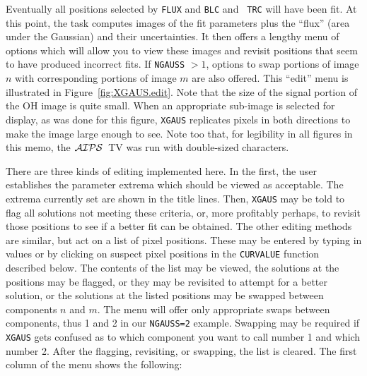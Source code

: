 \documentclass[twoside]{article}
\newcommand{\Hi}[1]{\textcolor{hicol}{#1}}
\newcommand{\AIPS}{{$\cal AIPS\/$}}
\begin{document}
Eventually all positions selected by {\tt FLUX} and {\tt BLC} and {\tt
  TRC} will have been fit.  At this point, the task computes images of
the fit parameters plus the ``flux'' (area under the Gaussian) and
their uncertainties.  It then offers a lengthy menu of options which
will allow you to view these images and revisit positions that seem to
have produced incorrect fits.  If {\tt NGAUSS} $> 1$, options to swap
portions of image $n$ with corresponding portions of image $m$ are
also offered.  This ``edit'' menu is illustrated in
Figure~\ref{fig:XGAUS.edit}.  Note that the size of the \Hi{signal
  portion of the} OH image is quite small.  \Hi{When an appropriate
  sub-image is selected for display, as was done for this figure},
{\tt XGAUS} replicates pixels in both directions to make the image
large enough to see.  Note too that, for legibility in all figures in
this memo, the \AIPS\ TV was run with double-sized characters.

There are three kinds of editing implemented here.  In the first, the
user establishes the parameter extrema which should be viewed as
acceptable.  The extrema currently set are shown in the title lines.
Then, {\tt XGAUS} may be told to flag all solutions not meeting these
criteria, or, more profitably perhaps, to revisit those positions to
see if a better fit can be obtained.  The other editing methods are
similar, but act on a list of pixel positions.  These may be entered
by typing in values or by clicking on suspect pixel positions in the
{\tt CURVALUE} function described below.  The contents of the list may
be viewed, the solutions at the positions may be flagged, or they may
be revisited to attempt for a better solution, or the solutions at the
listed positions may be swapped between components $n$ and $m$.  The
menu will offer only appropriate swaps between components, thus 1 and
2 in our {\tt NGAUSS=2} example.  Swapping may be required if {\tt
  XGAUS} gets confused as to which component you want to call number 1
and which number 2.  After the flagging, revisiting, or swapping, the
list is cleared.    The first column of the menu shows the following:
\end{document}
